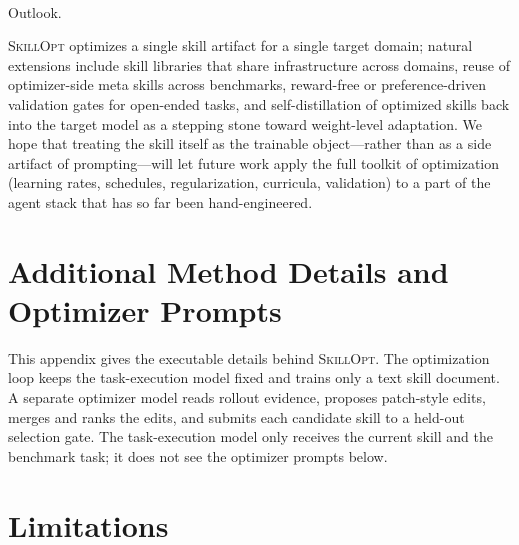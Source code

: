 \documentclass[
]{article}
\makeatletter
\let\oldparagraph\paragraph
\renewcommand{\paragraph}{
    \@ifstar
      \xxxParagraphStar
      \xxxParagraphNoStar
  }
\newcommand{\xxxParagraphStar}[1]{\oldparagraph*{#1}\mbox{}}
\newcommand{\xxxParagraphNoStar}[1]{\oldparagraph{#1}\mbox{}}
\newcommand{\ourmethod}{\textsc{SkillOpt}\xspace}
\makeatother
\begin{document}
\paragraph{Outlook.}\label{outlook.}

\ourmethod{} optimizes a single skill artifact for a single target
domain; natural extensions include skill libraries that share
infrastructure across domains, reuse of optimizer-side meta skills
across benchmarks, reward-free or preference-driven validation gates for
open-ended tasks, and self-distillation of optimized skills back into
the target model as a stepping stone toward weight-level adaptation. We
hope that treating the skill itself as the trainable object---rather
than as a side artifact of prompting---will let future work apply the
full toolkit of optimization (learning rates, schedules, regularization,
curricula, validation) to a part of the agent stack that has so far been
hand-engineered.

\FloatBarrier

\appendix

\section{Additional Method Details and Optimizer
Prompts}\label{sec-app-method-prompts}

This appendix gives the executable details behind \ourmethod{}. The
optimization loop keeps the task-execution model fixed and trains only a
text skill document. A separate optimizer model reads rollout evidence,
proposes patch-style edits, merges and ranks the edits, and submits each
candidate skill to a held-out selection gate. The task-execution model
only receives the current skill and the benchmark task; it does not see
the optimizer prompts below.

\section{Limitations}\label{limitations}
\end{document}
